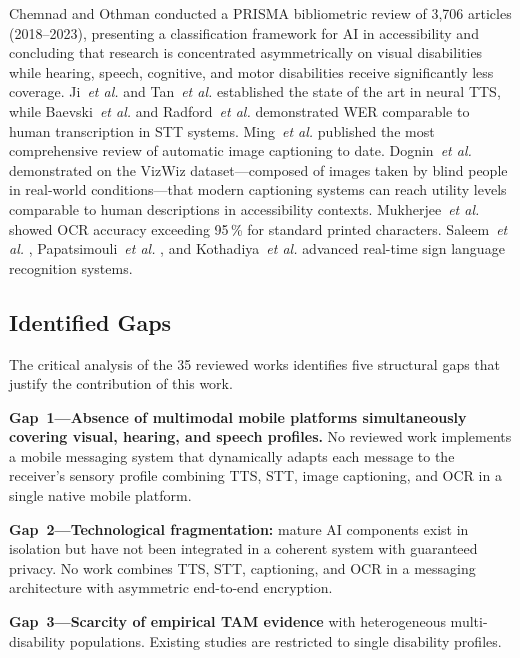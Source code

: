 \documentclass[journal]{IEEEtran}
\begin{document}
	Chemnad and Othman \cite{chemnad2024} conducted a PRISMA
	bibliometric review of 3{,}706 articles (2018--2023), presenting
	a classification framework for AI in accessibility and concluding
	that research is concentrated asymmetrically on visual
	disabilities while hearing, speech, cognitive, and motor
	disabilities receive significantly less coverage.
	Ji~\textit{et al.} \cite{ji2024} and Tan~\textit{et al.}
	\cite{tan2021} established the state of the art in neural TTS,
	while Baevski~\textit{et al.} \cite{baevski2020} and
	Radford~\textit{et al.} \cite{radford2023} demonstrated
	WER comparable to human transcription in STT systems.
	Ming~\textit{et al.} \cite{ming2022} published the most
	comprehensive review of automatic image captioning to date.
	Dognin~\textit{et al.} \cite{dognin2021} demonstrated on the
	VizWiz dataset---composed of images taken by blind people in
	real-world conditions---that modern captioning systems can reach
	utility levels comparable to human descriptions in accessibility
	contexts.
	Mukherjee~\textit{et al.} \cite{mukherjee2023} showed OCR
	accuracy exceeding 95\,\% for standard printed characters.
	Saleem~\textit{et al.} \cite{saleem2023},
	Papatsimouli~\textit{et al.} \cite{papatsimouli2023}, and
	Kothadiya~\textit{et al.} \cite{kothadiya2022} advanced
	real-time sign language recognition systems.
	
	\subsection{Identified Gaps}
	The critical analysis of the 35 reviewed works identifies five
	structural gaps that justify the contribution of this work.
	
	\textbf{Gap~1---Absence of multimodal mobile platforms simultaneously
		covering visual, hearing, and speech profiles.}
	No reviewed work implements a mobile messaging system that
	dynamically adapts each message to the receiver's sensory
	profile combining TTS, STT, image captioning, and OCR in a
	single native mobile platform.
	
	\textbf{Gap~2---Technological fragmentation:} mature AI components
	exist in isolation but have not been integrated in a coherent
	system with guaranteed privacy.
	No work combines TTS, STT, captioning, and OCR in a messaging
	architecture with asymmetric end-to-end encryption.
	
	\textbf{Gap~3---Scarcity of empirical TAM evidence} with
	heterogeneous multi-disability populations.
	Existing studies are restricted to single disability profiles.
	
\end{document}

